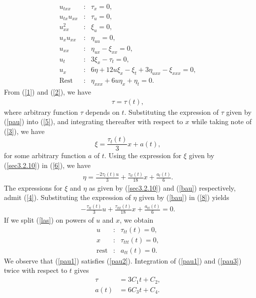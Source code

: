 \begin{eqnarray}
\label{1}u_{txx} &:& \tau_x=0, \\
\label{2}u_{tx} u_{xx} &:& \tau _u=0, \\
\label{3}u_{xx}^2& :&\xi _u=0, \\
\label{7}u_x u_{xx}& : &\eta_{uu}=0,\\
\label{4}u_{xx} &: &\eta_{ux}-\xi_{xx} =0, \\
\label{5}u_{t}& : &3\xi_x -\tau_{t} =0, \\
\label{6}u_{x} &:& 6\eta + 12 u \xi_x - \xi_{t}+3 \eta_{uxx}-\xi_{xxx} =0,\\
\label{8}\mbox{Rest} &:& \eta_{xxx}+6u\eta_{x}+\eta_{t}=0.
\end{eqnarray}
From (\ref{1}) and (\ref{2}), we have \begin{align} \label{pau}	\tau = \tau(t), \end{align} where  arbitrary function $\tau$ depends on $t$.
Substituting the expression of $\tau$ given by (\ref{pau}) into (\ref{5}), and integrating thereafter with respect to $x$ while taking note of (\ref{3}), we have 
  \begin{equation} \xi = \frac{\tau_t(t) }{3}x + a(t),\label{sec3.2.10}
\end{equation} for some arbitrary function $a$ of $t$. 
Using the expression  for $\xi$ given by (\ref{sec3.2.10}) in  (\ref{6}), we have 
\begin{align}\eta = \frac{-2\tau_{t}(t) u}{3}+  \frac{\tau_{tt}(t) }{18}x +  \frac{a_t(t)}{6}. \label{bau}
\end{align}
The expressions for  $\xi$ and $\eta$ as given by  (\ref{sec3.2.10}) and  (\ref{bau}) respectively, 
 admit (\ref{4}).  Substituting the expression of $\eta$ given by (\ref{bau}) in (\ref{8}) yields 
\begin{align} \label{las}-\frac{\tau_{tt}(t) }{3}u + \frac{\tau_{ttt}(t) }{18}x + \frac{ a_{tt}(t)}{6} =0. 
\end{align} 
 If we split  (\ref{las}) on powers of $u$ and $x$, we obtain
 \begin{eqnarray}
\label{pau1} u&:& \tau_{tt}(t) =0,\\
\label{pau2}  x &:& \tau_{ttt}(t) =0,\\
\label{pau3} \mbox{rest}  &:& a_{tt}(t)=0.
 \end{eqnarray}
We observe that  (\ref{pau1}) satisfies  (\ref{pau2}). Integration of  (\ref{pau1}) and (\ref{pau3})  twice with respect to $t$ gives \begin{align}
 \tau &= 3C_1t + C_2,\\
 a(t)&= 6C_3 t + C_4.
 \end{align}
